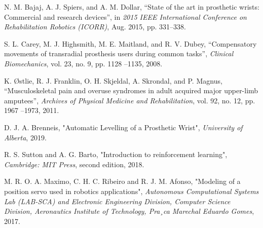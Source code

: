 \documentclass[letterpaper,12pt]{article}
\begin{document}
\pagebreak

\begin{thebibliography}{99}
N. M. Bajaj, A. J. Spiers, and A. M. Dollar, “State of the art in prosthetic wrists: Commercial and research devices”, in \textit{2015 IEEE International Conference on Rehabilitation Robotics
(ICORR)}, Aug. 2015, pp. 331–338.

S. L. Carey, M. J. Highsmith, M. E. Maitland, and R. V. Dubey, “Compensatory movements
of transradial prosthesis users during common tasks”, \textit{Clinical Biomechanics}, vol. 23, no. 9,
pp. 1128 –1135, 2008.



K. Østlie, R. J. Franklin, O. H. Skjeldal, A. Skrondal, and P. Magnus, “Musculoskeletal pain
and overuse syndromes in adult acquired major upper-limb amputees”, \textit{Archives of Physical
Medicine and Rehabilitation}, vol. 92, no. 12, pp. 1967 –1973, 2011.

D. J. A. Brenneis, "Automatic Levelling of a Prosthetic Wrist", \textit{University of Alberta}, 2019.

R. S. Sutton and A. G. Barto, "Introduction to reinforcement learning", \textit{Cambridge: MIT
Press}, second edition, 2018.

M. R. O. A. Maximo, C. H. C. Ribeiro and R. J. M. Afonso, "Modeling of a position servo used in robotics applications", \textit{Autonomous Computational Systems Lab (LAB-SCA) and Electronic Engineering Division, Computer Science Division, Aeronautics
Institute of Technology, Pra¸ca Marechal Eduardo Gomes}, 2017.


\end{thebibliography}
\end{document}
